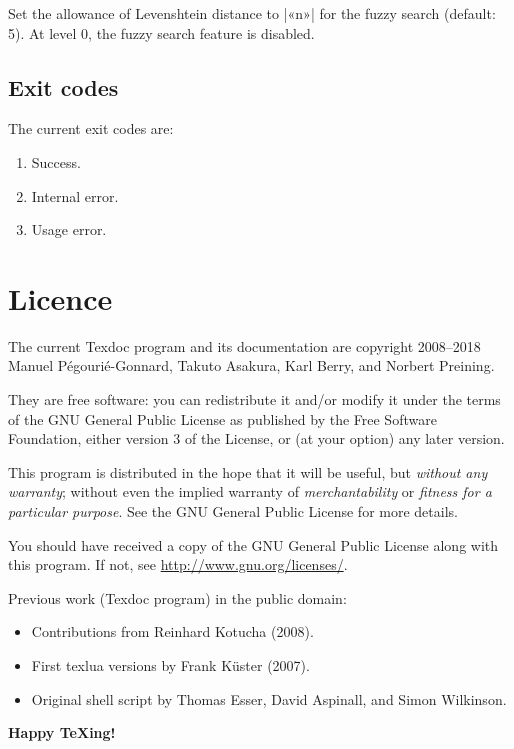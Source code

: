 \documentclass[a4paper, oneside]{scrartcl}
\begin{document}
Set the allowance of Levenshtein distance to |«n»| for the fuzzy search
(default: 5). At level 0, the fuzzy search feature is disabled.

\subsection{Exit codes}\label{ss-exit}

The current exit codes are:
\begin{enumerate}[start=0]
  \item Success.
  \item Internal error.
  \item Usage error.
\end{enumerate}

\section{Licence}\label{s-licence}

The current Texdoc program and its documentation are copyright 2008--2018
Manuel Pégourié-Gonnard, Takuto Asakura, Karl Berry, and Norbert Preining.

They are free software: you can redistribute it and/or modify it under the
terms of the GNU General Public License as published by the Free Software
Foundation, either version 3 of the License, or (at your option) any later
version.

This program is distributed in the hope that it will be useful, but
\emph{without any warranty}; without even the implied warranty of
\emph{merchantability} or \emph{fitness for a particular purpose}.  See the
GNU General Public License for more details.

You should have received a copy of the GNU General Public License along with
this program.  If not, see \url{http://www.gnu.org/licenses/}.

\bigskip

Previous work (Texdoc program) in the public domain:
\begin{itemize}
  \item Contributions from Reinhard Kotucha (2008).
  \item First texlua versions by Frank Küster (2007).
  \item Original shell script by Thomas Esser, David Aspinall, and Simon
	Wilkinson.
\end{itemize}

\bigskip
\begin{center}\Large\rmfamily\bfseries
  Happy {\TeX}ing!
\end{center}
\end{document}
